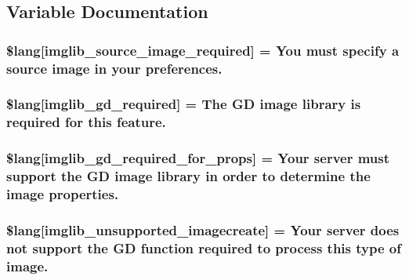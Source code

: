 \subsection{Variable Documentation}
\hypertarget{imglib__lang_8php_af48787ab142f633036ebdf1cc5da7409}{}
\subsubsection[{\$lang}]{\setlength{\rightskip}{0pt plus 5cm}\$lang\mbox{[}\textquotesingle{}imglib\+\_\+source\+\_\+image\+\_\+required\textquotesingle{}\mbox{]} = \textquotesingle{}You must specify {\bf a} source image in your preferences.\textquotesingle{}}\label{imglib__lang_8php_af48787ab142f633036ebdf1cc5da7409}
\hypertarget{imglib__lang_8php_aa8d7f8276e62fbe759daef2021c16552}{}
\subsubsection[{\$lang}]{\setlength{\rightskip}{0pt plus 5cm}\$lang\mbox{[}\textquotesingle{}imglib\+\_\+gd\+\_\+required\textquotesingle{}\mbox{]} = \textquotesingle{}The G\+D image library is required for this feature.\textquotesingle{}}\label{imglib__lang_8php_aa8d7f8276e62fbe759daef2021c16552}
\hypertarget{imglib__lang_8php_a0da9c99f9e2b5f38ccbefb9d9f702c5e}{}
\subsubsection[{\$lang}]{\setlength{\rightskip}{0pt plus 5cm}\$lang\mbox{[}\textquotesingle{}imglib\+\_\+gd\+\_\+required\+\_\+for\+\_\+props\textquotesingle{}\mbox{]} = \textquotesingle{}Your server must support the G\+D image library in order to determine the image properties.\textquotesingle{}}\label{imglib__lang_8php_a0da9c99f9e2b5f38ccbefb9d9f702c5e}
\hypertarget{imglib__lang_8php_ace032cbe8dafb1f3417a758d0914ecdb}{}
\subsubsection[{\$lang}]{\setlength{\rightskip}{0pt plus 5cm}\$lang\mbox{[}\textquotesingle{}imglib\+\_\+unsupported\+\_\+imagecreate\textquotesingle{}\mbox{]} = \textquotesingle{}Your server does not support the G\+D function required to process this type of image.\textquotesingle{}}\label{imglib__lang_8php_ace032cbe8dafb1f3417a758d0914ecdb}
\hypertarget{imglib__lang_8php_a235a59a6660145fc136b3933b5b10675}{}
